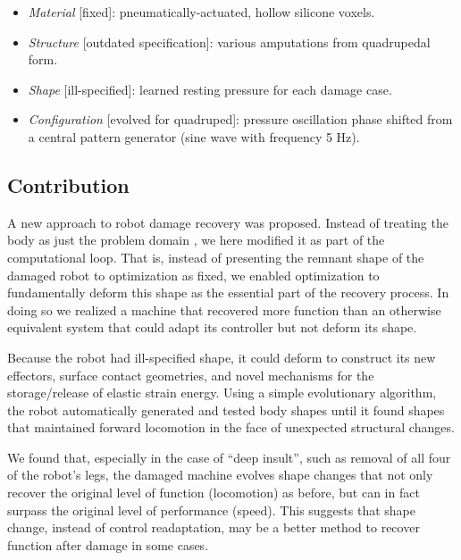 \begin{itemize}
    \item \textit{Material} [fixed]: pneumatically-actuated, hollow silicone voxels.
    \item \textit{Structure} [outdated specification]: various amputations from quadrupedal form.
    \item \textit{Shape} [ill-specified]: learned resting pressure for each damage case.
    \item \textit{Configuration} [evolved for quadruped]: pressure oscillation phase shifted from a central pattern generator (sine wave with frequency 5 Hz).
\end{itemize}



\subsection{Contribution}



A new approach to robot damage recovery was proposed.
Instead of treating the body as just the problem domain \cite{bongard2006resilient,cully2015robots}, we here modified it as part of the computational loop.
That is, 
instead of presenting the remnant shape of the damaged robot to optimization as 
fixed, we enabled optimization to fundamentally deform this shape as the essential part of the recovery process.
In doing so we realized a machine that recovered more function than an otherwise equivalent system that could adapt its controller but not deform its shape.

Because the robot had ill-specified shape,
it could deform to construct its new effectors, surface contact geometries, and novel mechanisms for the storage/release of elastic strain energy.
Using a simple evolutionary algorithm, 
the robot automatically generated and tested body shapes until it found shapes that maintained forward locomotion in the face of unexpected structural changes.

We found that, especially in the case of ``deep insult'', such as removal of all four of the robot's legs, the damaged machine evolves shape changes that not only recover the original level of function (locomotion) as before, but can in fact surpass the original level of performance (speed).
This suggests that shape change, instead of control readaptation, may be a better method to recover function after damage in some cases.





